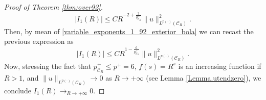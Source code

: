 \documentclass[a4paper,12pt]{amsart}
\theoremstyle{definition}
\theoremstyle{plain}
\def\vu{ u }
\begin{document}
\begin{proof}[Proof of Theorem \ref{thm:over92}]
\begin{equation}\label{estimateI1_92_exterior_bola}
|I_1(R)|\leq 
  C R^{-2+\frac 3{q_{ \mathcal{C}_R }^-}} 
\|\vu\|_{L^{p(\cdot)}(  \mathcal{C}_R )}^2.
\end{equation}
Then, by mean of \eqref{variable_exponents_1_92_exterior_bola} we can recast the previous expression as 
\begin{equation}\label{estimateI122}
|I_1(R)|\leq 
  C R^{1-\frac 6{p_{ \mathcal{C}_R }^+}} 
\|\vu\|_{L^{p(\cdot)}(  \mathcal{C}_R  )}^2.
\end{equation}
Now, stressing the fact that $p_{ \mathcal{C}_R }^+ \leq p^+=6 $, $f(s)=R^s$ is an increasing function if $R>1$, and $\|\vu\|_{L^{p(\cdot)}(  \mathcal{C}_R  )}\to 0$ as  $R\to +\infty$ (see Lemma \ref{Lemma.utendzero}), we conclude 
$
I_1(R) \to_{R\to +\infty} 0. 
$


\end{proof}
\end{document}
